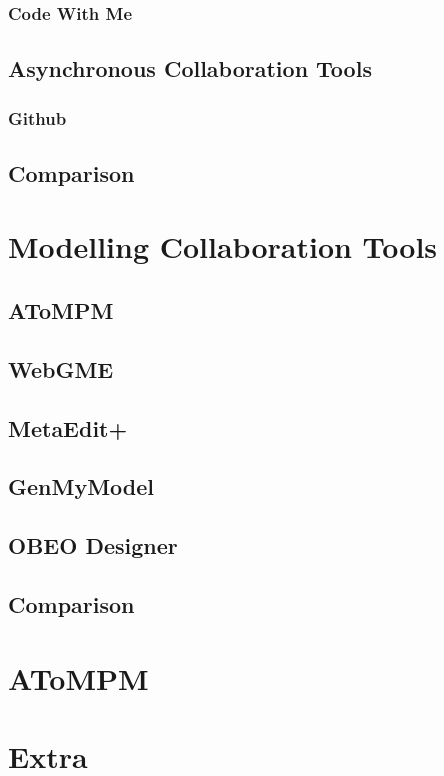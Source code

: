 \subsubsection{Code With Me}

\subsection{Asynchronous Collaboration Tools}
\subsubsection{Github}

\subsection{Comparison}

\section{Modelling Collaboration Tools}

\subsection{AToMPM}
\subsection{WebGME}
\subsection{MetaEdit+}
\subsection{GenMyModel}
\subsection{OBEO Designer}
\subsection{Comparison}

\section{AToMPM}

\section{Extra}
